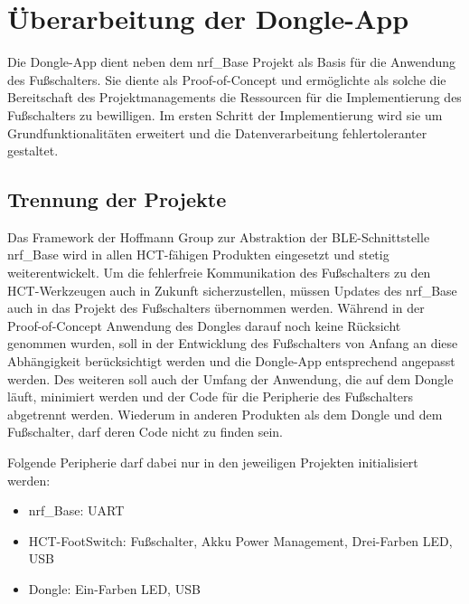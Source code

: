 \section{Überarbeitung der Dongle-App}
Die Dongle-App dient neben dem nrf\_Base Projekt als Basis für die Anwendung des Fußschalters. Sie diente als Proof-of-Concept und ermöglichte als solche die Bereitschaft des Projektmanagements die Ressourcen für die Implementierung des Fußschalters zu bewilligen. Im ersten Schritt der Implementierung wird sie um Grundfunktionalitäten erweitert und die Datenverarbeitung fehlertoleranter gestaltet.

\subsection{Trennung der Projekte}
Das Framework der Hoffmann Group zur Abstraktion der BLE-Schnittstelle nrf\_Base wird in allen HCT-fähigen Produkten eingesetzt und stetig weiterentwickelt. Um die fehlerfreie Kommunikation des Fußschalters zu den HCT-Werkzeugen auch in Zukunft sicherzustellen, müssen Updates des nrf\_Base auch in das Projekt des Fußschalters übernommen werden. Während in der Proof-of-Concept Anwendung des Dongles darauf noch keine Rücksicht genommen wurden, soll in der Entwicklung des Fußschalters von Anfang an diese Abhängigkeit berücksichtigt werden und die Dongle-App entsprechend angepasst werden. Des weiteren soll auch der Umfang der Anwendung, die auf dem Dongle läuft, minimiert werden und der Code für die Peripherie des Fußschalters abgetrennt werden. Wiederum in anderen Produkten als dem Dongle und dem Fußschalter, darf deren Code nicht zu finden sein.

Folgende Peripherie darf dabei nur in den jeweiligen Projekten initialisiert werden:
\begin{itemize}
	\item nrf\_Base: UART
	\item HCT-FootSwitch: Fußschalter, Akku Power Management, Drei-Farben LED, USB
	\item Dongle: Ein-Farben LED, USB
\end{itemize}

